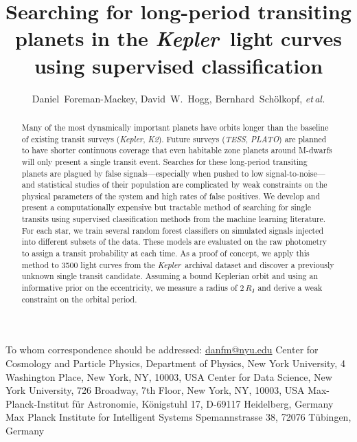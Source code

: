 \documentclass[12pt,preprint]{aastex}
\newcommand{\project}[1]{\textsl{#1}}
\newcommand{\kepler}{\project{Kepler}}
\newcommand{\KT}{\project{K2}}
\newcommand{\tess}{\project{TESS}}
\newcommand{\plato}{\project{PLATO}}
\newcommand{\foreign}[1]{\emph{#1}}
\newcommand{\etal}{\foreign{et\,al.}}
\begin{document}
\title{%
    Searching for long-period transiting planets in the \kepler\ light curves
    using supervised classification
}

\newcommand{\nyu}{2}
\newcommand{\cds}{3}
\newcommand{\mpia}{4}
\newcommand{\mpis}{5}
\author{%
    Daniel~Foreman-Mackey\altaffilmark{1,\nyu,\cds},
    David~W.~Hogg\altaffilmark{\nyu,\mpia,\cds},
    Bernhard~Sch\"olkopf\altaffilmark{\mpis},
    \etal
}
         {To whom correspondence should be addressed:
                          \url{danfm@nyu.edu}}
\altaffiltext{\nyu}      {Center for Cosmology and Particle Physics,
                          Department of Physics, New York University,
                          4 Washington Place, New York, NY, 10003, USA}
\altaffiltext{\cds}      {Center for Data Science, New York University,
                          726 Broadway, 7th Floor, New York, NY, 10003, USA}
\altaffiltext{\mpia}     {Max-Planck-Institut f\"ur Astronomie,
                          K\"onigstuhl 17, D-69117 Heidelberg, Germany}
\altaffiltext{\mpis}     {Max Planck Institute for Intelligent Systems
                          Spemannstrasse 38, 72076 T\"ubingen, Germany}

\begin{abstract}

Many of the most dynamically important planets have orbits longer than the
baseline of existing transit surveys (\kepler, \KT).
Future surveys (\tess, \plato) are planned to have shorter continuous coverage
that even habitable zone planets around M-dwarfs will only present a single
transit event.
Searches for these long-period transiting planets are plagued by false
signals---especially when pushed to low signal-to-noise---and statistical
studies of their population are complicated by weak constraints on the
physical parameters of the system and high rates of false positives.
We develop and present a computationally expensive but tractable method of
searching for single transits using supervised classification methods from
the machine learning literature.
For each star, we train several random forest classifiers on simulated signals
injected into different subsets of the data.
These models are evaluated on the raw photometry to assign a transit
probability at each time.
As a proof of concept, we apply this method to 3500 light curves from the
\kepler\ archival dataset and discover a previously unknown single transit
candidate.
Assuming a bound Keplerian orbit and using an informative prior on the
eccentricity, we measure a radius of $2\,R_\mathrm{J}$ and derive a weak
constraint on the orbital period.

\end{abstract}
\end{document}
